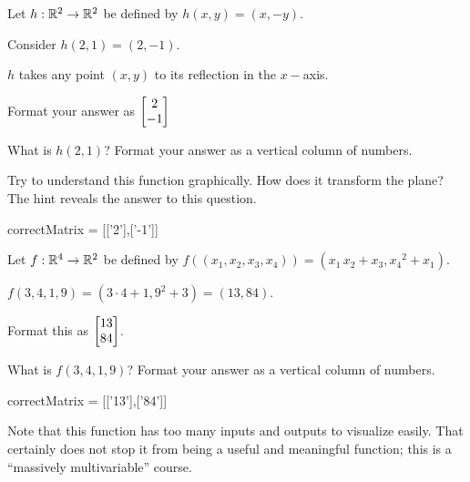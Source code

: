 \documentclass{ximera}
\begin{document}
\begin{question}
  Let $h:\mathbb R^2 \to \mathbb R^2$ be defined by $h(x,y) = (x,-y)$.
  \begin{solution}
    \begin{hint}
      Consider $h(2,1) = (2,-1)$.
    \end{hint}
    \begin{hint}
    \end{hint}
    \begin{hint}
      $h$ takes any point $(x,y)$ to its reflection in the $x-$axis.
    \end{hint}
    \begin{hint}
    	Format your answer as $\begin{bmatrix}2\\-1\end{bmatrix}$
    \end{hint}
    
    What is $h(2,1)$?  Format your answer as a vertical column of numbers.
    
    Try to understand this function graphically.  How does it transform the plane?  The hint reveals the answer to this question.
    
    \begin{matrix-answer}
      correctMatrix = [['2'],['-1']]
    \end{matrix-answer}
  \end{solution}
  
\end{question}
  
\begin{question}
  Let $f:\mathbb R^4 \to \mathbb R^2$ be defined by $f((x_1,x_2,x_3,x_4)) = (x_1 \, x_2+x_3,{x_4}^2+x_1)$.
  \begin{solution}
    \begin{hint}
      $f(3,4,1,9) = (3\cdot 4+1,9^2+3) = (13,84)$.
    \end{hint}
    \begin{hint}
      Format this as $\begin{bmatrix}13\\84\end{bmatrix}$.
    \end{hint}
    What is $f(3,4,1,9)$? Format your answer as a vertical column of numbers.
    \begin{matrix-answer}
      correctMatrix = [['13'],['84']]
    \end{matrix-answer}
  \end{solution}

  Note that this function has too many inputs and outputs to visualize
  easily.  That certainly does not stop it from being a useful and meaningful
  function; this is a ``massively multivariable'' course.
\end{question}
\end{document}
